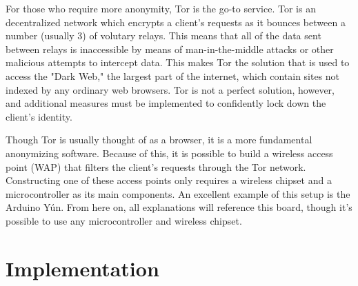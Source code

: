 \documentclass{article}
\begin{document}
For those who require more anonymity, Tor is the go-to service. Tor is an decentralized network which encrypts a client's requests as it bounces between a number (usually 3) of volutary relays.\cite{Tor} This means that all of the data sent between relays is inaccessible by means of man-in-the-middle attacks or other malicious attempts to intercept data. This makes Tor the solution that is used to access the "Dark Web," the largest part of the internet, which contain sites not indexed by any ordinary web browsers. Tor is not a perfect solution, however, and additional measures must be implemented to confidently lock down the client's identity.

Though Tor is usually thought of as a browser, it is a more fundamental anonymizing software. Because of this, it is possible to build a wireless access point (WAP) that filters the client's requests through the Tor network. Constructing one of these access points only requires a wireless chipset and a microcontroller as its main components. An excellent example of this setup is the Arduino Yún.\cite{ArduinoYun} From here on, all explanations will reference this board, though it's possible to use any microcontroller and wireless chipset.



%
%



\section*{Implementation}
\end{document}
